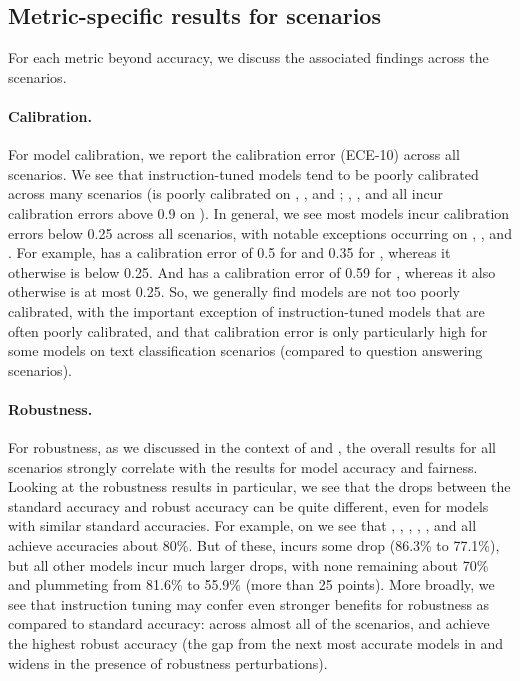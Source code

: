 \hypertarget{metric-experiments}{\subsection{Metric-specific results for \core scenarios}}
\label{sec:metric-specific}
For each metric beyond accuracy, we discuss the associated findings across the \numcorescenarios \core scenarios.

\paragraph{Calibration.}
%

For model calibration, we report the calibration error (ECE-10) across all \core scenarios. 
We see that instruction-tuned models tend to be poorly calibrated across many scenarios (\eg \anthropic is poorly calibrated on \mmlu, \narrativeqa, and \naturalquestions; \instructdavinci, \instructcurie, and \instructbabbage all incur calibration errors above 0.9 on \imdb).
In general, we see most models incur calibration errors below 0.25 across all \core scenarios, with notable exceptions occurring on \imdb, \civilcomments, and \raft.
For example, \yalm has a calibration error of 0.5 for \imdb and 0.35 for \raft, whereas it otherwise is below 0.25.
And \jurassicjumbo has a calibration error of 0.59 for \civilcomments, whereas it also otherwise is at most 0.25.
So, we generally find models are not too poorly calibrated, with the important exception of instruction-tuned models that are often poorly calibrated, and that calibration error is only particularly high for some models on text classification scenarios (\eg compared to question answering scenarios). 

\paragraph{Robustness.}
%

For robustness, as we discussed in the context of  and , the overall results for all scenarios  strongly correlate with the results for model accuracy and fairness.
Looking at the robustness results in particular, we see that the drops between the standard accuracy and robust accuracy can be quite different, even for models with similar standard accuracies.
For example, on \boolq we see that \anthropic, \tfive, \ultwo, \optonesevenfive, \instructdavinci, and \glm all achieve accuracies about 80\%. 
But of these, \instructdavinci incurs some drop (86.3\% to 77.1\%), but all other models incur much larger drops, with none remaining about 70\% and \optonesevenfive plummeting from 81.6\% to 55.9\% (more than 25 points). 
More broadly, we see that instruction tuning may confer even stronger benefits for robustness as compared to standard accuracy: across almost all of the \core scenarios, \anthropic and \instructdavinci achieve the highest robust accuracy (\ie the gap from the next most accurate models in \optonesevenfive and \glm widens in the presence of robustness perturbations).

